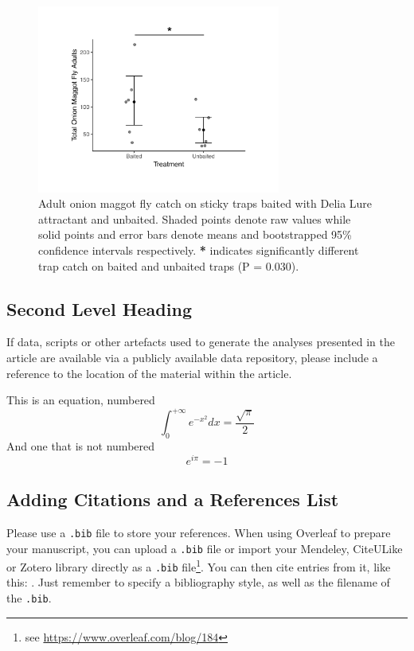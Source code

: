 \documentclass[alpha-refs]{wiley-article}
\begin{document}
\begin{figure}[bt]
\centering
\includegraphics[width = 8cm]{figures/publication/figure-4.pdf}
\caption{Adult onion maggot fly catch on sticky traps baited with Delia Lure attractant and unbaited.  Shaded points denote raw values while solid points and error bars denote means and bootstrapped 95\% confidence intervals respectively.  \textbf{*} indicates significantly different trap catch on baited and unbaited traps (P = 0.030). }
\label{fig:figure4}
\end{figure}



\subsection{Second Level Heading}
If data, scripts or other artefacts used to generate the analyses presented in the article are available via a publicly available data repository, please include a reference to the location of the material within the article.

This is an equation, numbered
\begin{equation}
\int_0^{+\infty}e^{-x^2}dx=\frac{\sqrt{\pi}}{2}
\end{equation}
And one that is not numbered
\begin{equation*}
e^{i\pi}=-1
\end{equation*}

\subsection{Adding Citations and a References List}

Please use a \verb|.bib| file to store your references. When using Overleaf to prepare your manuscript, you can upload a \verb|.bib| file or import your Mendeley, CiteULike or Zotero library directly as a \verb|.bib| file\footnote{see \url{https://www.overleaf.com/blog/184}}. You can then cite entries from it, like this: \cite{lees2010theoretical}. Just remember to specify a bibliography style, as well as the filename of the \verb|.bib|.
\end{document}
